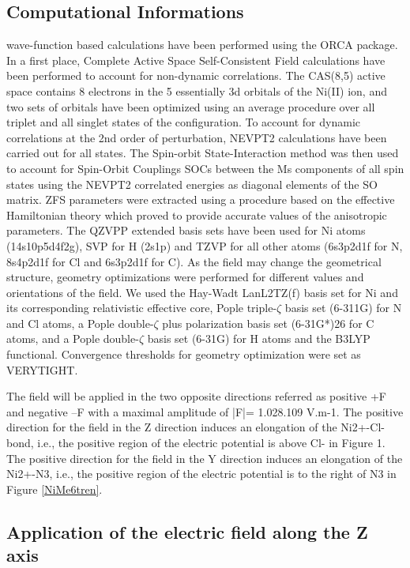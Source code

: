 \documentclass[10pt]{report}
\numberwithin{equation}{section}
\begin{document}
\subsection{Computational Informations}
wave-function based calculations have been performed using the ORCA package.
In a first place, Complete Active Space Self-Consistent Field calculations have been performed to account for non-dynamic correlations. 
The CAS(8,5) active space contains 8 electrons in the 5 essentially 3d orbitals of the Ni(II) ion, and two sets of orbitals have been optimized using an average procedure over all triplet and all singlet states of the configuration.
To account for dynamic correlations at the 2nd order of perturbation, NEVPT2 calculations have been carried out for all states. 
The Spin-orbit State-Interaction method was then used to account for Spin-Orbit Couplings SOCs between the Ms components of all spin states using the NEVPT2 correlated energies as diagonal elements of the SO matrix. 
ZFS parameters were extracted using a procedure based on the effective Hamiltonian theory which proved to provide accurate values of the anisotropic parameters. 
The QZVPP extended basis sets have been used for Ni atoms (14s10p5d4f2g), SVP for H (2s1p) and TZVP for all other atoms (6s3p2d1f for N, 8s4p2d1f for Cl and 6s3p2d1f for C). 
As the field may change the geometrical structure, geometry optimizations were performed for different values and orientations of the field. 
We used the Hay-Wadt LanL2TZ(f) basis set for Ni and its corresponding relativistic effective core, Pople triple-$\zeta$ basis set (6-311G) for N and Cl atoms, a Pople double-$\zeta$ plus polarization basis set (6-31G*)26 for C atoms, and a Pople double-$\zeta$ basis set (6-31G) for H atoms and the B3LYP functional.
Convergence thresholds for geometry optimization were set as VERYTIGHT.

The field will be applied in the two opposite directions referred as positive +F and negative –F with a maximal amplitude of |F|= 1.028.109 V.m-1.
The positive direction for the field in the Z direction induces an elongation of the Ni2+-Cl- bond, i.e., the positive region of the electric potential is above Cl- in Figure 1. 
The positive direction for the field in the Y direction induces an elongation of the Ni2+-N3, i.e., the positive region of the electric potential is to the right of N3 in Figure \ref{NiMe6tren}.

\subsection{Application of the electric field along the Z axis}
\end{document}
